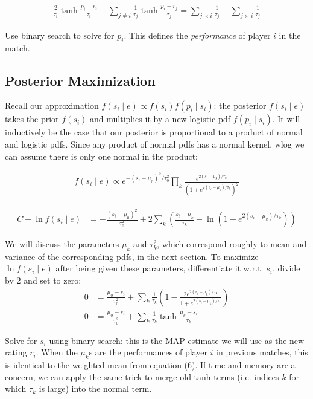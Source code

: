 \documentclass{article}
\begin{document}
\begin{align}
\frac{2}{\tau_i} \tanh\frac {p_i - r_i} {\tau_i} + \sum_{j\neq i}\frac{1}{\tau_j} \tanh\frac {p_i - r_j} {\tau_j} = \sum_{j\prec i} \frac{1}{\tau_j} - \sum_{j\succ i} \frac{1}{\tau_j}
\end{align}

Use binary search to solve for $p_i$. This defines the \emph{performance} of player $i$ in the match.

\subsection{Posterior Maximization}

Recall our approximation $f(s_i\mid e) \propto f(s_i)f(p_i\mid s_i)$: the posterior $f(s_i \mid e)$ takes the prior $f(s_i)$ and multiplies it by a new logistic pdf $f(p_i\mid s_i)$. It will inductively be the case that our posterior is proportional to a product of normal and logistic pdfs. Since any product of normal pdfs has a normal kernel, wlog we can assume there is only one normal in the product:

\begin{align}
f(s_i\mid e) \propto e^{-(s_i-\mu_0)^2/\tau_0^2} \prod_k \frac { e^{2(s_i-\mu_k)/\tau_k} } { \left(1 + e^{2(s_i-\mu_k)/\tau_k} \right)^2 }
\end{align}

\begin{align}
C + \ln f(s_i \mid e) &= -\frac{(s_i-\mu_0)^2}{\tau_0^2} + 2\sum_k \left( \frac{s_i-\mu_k}{\tau_k} - \ln(1 + e^{2(s_i-\mu_k)/\tau_k}) \right)
\end{align}

We will discuss the parameters $\mu_k$ and $\tau_k^2$, which correspond roughly to mean and variance of the corresponding pdfs, in the next section. To maximize $\ln f(s_i \mid e)$ after being given these parameters, differentiate it w.r.t. $s_i$, divide by 2 and set to zero:
\begin{align}
0 &= \frac{\mu_0-s_i}{\tau_0^2} + \sum_k \frac{1}{\tau_k}\left( 1 - \frac {2e^{2(s_i-\mu_k)/\tau_k}} {1 + e^{2(s_i-\mu_k)/\tau_k}} \right)
\\0 &=  \frac{\mu_0-s_i}{\tau_0^2} + \sum_k \frac{1}{\tau_k} \tanh \frac {\mu_k-s_i} {\tau_k}
\end{align}

Solve for $s_i$ using binary search: this is the MAP estimate we will use as the new rating $r_i$. When the $\mu_k$s are the performances of player $i$ in previous matches, this is identical to the weighted mean from equation (6). If time and memory are a concern, we can apply the same trick to merge old tanh terms (i.e. indices $k$ for which $\tau_k$ is large) into the normal term.
\end{document}
